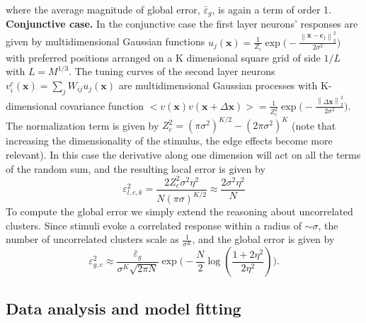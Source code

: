 \documentclass[a4paper]{article}%
\begin{document}
where the average magnitude of global error, $\bar{\varepsilon}_{g}$, is again
a term of order 1. \newline\newline\textbf{Conjunctive case.} In the
conjunctive case the first layer neurons' responses are given by
multidimensional Gaussian functions $u_{j}(\mathbf{x}) =\frac{1}{Z_{c}}
\exp{\Big(-\frac{\left\|  \mathbf{x}-\mathbf{c}_{j}\right\| _{2}^{2}}%
{2\sigma^{2}}\Big)}$ with preferred positions arranged on a K dimensional
square grid of side $1/L$ with $L = M^{1/3}$. The tuning curves of the second
layer neurons $v^{c}_{i}(\mathbf{x}) = \sum_{j} W_{ij} u_{j}(\mathbf{x})$ are
multidimensional Gaussian processes with K-dimensional covariance function
$<v(\mathbf{x})v(\mathbf{x} + \Delta\mathbf{x}) > = \frac{1}{Z_{c}^{2}}
\exp{\Big(-\frac{\left\| \Delta\mathbf{x}\right\| _{2}^{2}}{2\sigma^{2}}%
\Big)}$. The normalization term is given by $Z_{c}^{2} = (\pi\sigma^{2})^{K/2}
- (2\pi\sigma^{2})^{K}$ (note that increasing the dimensionality of the
stimulus, the edge effects become more relevant). In this case the derivative
along one dimension will act on all the terms of the random sum, and the
resulting local error is given by
\begin{equation}
\varepsilon_{l,c,k}^{2} = \frac{2Z_{c}^{2} \sigma^{2} \eta^{2}}{N(\pi
\sigma)^{K/2}} \approx\frac{2\sigma^{2} \eta^{2}}{N}%
\end{equation}
To compute the global error we simply extend the reasoning about uncorrelated
clusters. Since stimuli evoke a correlated response within a radius of
$\sim\sigma$, the number of uncorrelated clusters scale as $\frac{1}%
{\sigma^{K}}$, and the global error is given by
\begin{equation}
\varepsilon_{g,c}^{2} \approx\frac{\bar{\varepsilon}_{g}}{\sigma^{K}\sqrt{2\pi
N}} \exp{\Big(-\frac{N}{2} \log(\frac{1+2\eta^{2}}{2\eta^{2}})\Big)}.
\end{equation}


\subsection{Data analysis and model fitting}
\end{document}
